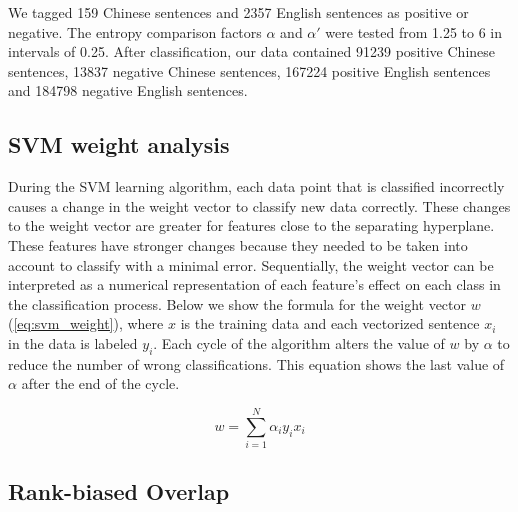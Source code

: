 \documentclass[smallextended,natbib]{svjour3}       %
\begin{document}
We tagged 159 Chinese sentences and \num[group-separator={,}]{2357} English sentences as positive or negative. The entropy comparison factors \(\alpha\) and \(\alpha'\) were tested from 1.25 to 6 in intervals of 0.25. After classification, our data contained \num[group-separator={,}]{91239} positive Chinese sentences, \num[group-separator={,}]{13837} negative Chinese sentences, \num[group-separator={,}]{167224} positive English sentences and \num[group-separator={,}]{184798} negative English sentences. 

\subsection{SVM weight analysis}\label{svmweightsanalysis}

During the SVM learning algorithm, each data point that is classified incorrectly causes a change in the weight vector to classify new data correctly. These changes to the weight vector are greater for features close to the separating hyperplane. These features have stronger changes because they needed to be taken into account to classify with a minimal error. Sequentially, the weight vector can be interpreted as a numerical representation of each feature's effect on each class in the classification process. Below we show the formula for the weight vector \(w\) (\ref{eq:svm_weight}), where \(x\) is the training data and each vectorized sentence \(x_i\) in the data is labeled \(y_i\). Each cycle of the algorithm alters the value of \(w\) by \(\alpha\) to reduce the number of wrong classifications. This equation shows the last value of \(\alpha\) after the end of the cycle.

\begin{equation}\label{eq:svm_weight}
w = \sum_{i=1}^N \alpha_i y_i x_i
\end{equation}

\subsection{Rank-biased Overlap}\label{rbo}
\end{document}
